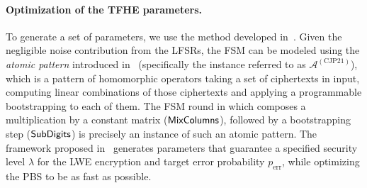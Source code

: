 \paragraph{Optimization of the TFHE parameters.}
To generate a set of parameters, we use the method developed in~\cite{JC:BBBCLOT23}. Given the negligible noise contribution from the LFSRs, the FSM can be modeled using the \emph{atomic pattern} introduced in~\cite{JC:BBBCLOT23} (specifically the instance referred to as $\mathcal{A}^{(\text{CJP21})}$), which is a pattern of homomorphic operators taking a set of ciphertexts in input, computing linear combinations of those ciphertexts and applying a programmable bootstrapping to each of them. The FSM round in \coolName which composes a multiplication by a constant matrix ($\text{\textsf{MixColumns}}$), followed by a bootstrapping step ($\text{\textsf{SubDigits}}$) is precisely an instance of such an atomic pattern. The framework proposed in~\cite{JC:BBBCLOT23} generates parameters that guarantee a specified security level $\lambda$ for the LWE encryption and target error probability $p_{\text{err}}$, while optimizing the PBS to be as fast as possible. 
\fi


